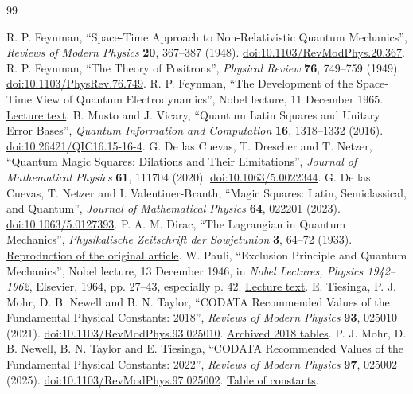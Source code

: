 \begin{thebibliography}{99}
\setlength{\itemsep}{2pt plus .5pt minus .5pt}
{}
 R. P. Feynman, ``Space-Time Approach to Non-Relativistic Quantum Mechanics'', \emph{Reviews of Modern Physics} \textbf{20}, 367--387 (1948). \href{https://doi.org/10.1103/RevModPhys.20.367}{doi:10.1103/RevModPhys.20.367}.
 R. P. Feynman, ``The Theory of Positrons'', \emph{Physical Review} \textbf{76}, 749--759 (1949). \href{https://doi.org/10.1103/PhysRev.76.749}{doi:10.1103/PhysRev.76.749}.
 R. P. Feynman, ``The Development of the Space-Time View of Quantum Electrodynamics'', Nobel lecture, 11 December 1965. \href{https://www.nobelprize.org/prizes/physics/1965/feynman/lecture/}{Lecture text}.
 B. Musto and J. Vicary, ``Quantum Latin Squares and Unitary Error Bases'', \emph{Quantum Information and Computation} \textbf{16}, 1318--1332 (2016). \href{https://doi.org/10.26421/QIC16.15-16-4}{doi:10.26421/QIC16.15-16-4}.
 G. De las Cuevas, T. Drescher and T. Netzer, ``Quantum Magic Squares: Dilations and Their Limitations'', \emph{Journal of Mathematical Physics} \textbf{61}, 111704 (2020). \href{https://doi.org/10.1063/5.0022344}{doi:10.1063/5.0022344}.
 G. De las Cuevas, T. Netzer and I. Valentiner-Branth, ``Magic Squares: Latin, Semiclassical, and Quantum'', \emph{Journal of Mathematical Physics} \textbf{64}, 022201 (2023). \href{https://doi.org/10.1063/5.0127393}{doi:10.1063/5.0127393}.
 P. A. M. Dirac, ``The Lagrangian in Quantum Mechanics'', \emph{Physikalische Zeitschrift der Sowjetunion} \textbf{3}, 64--72 (1933). \href{https://www.informationphilosopher.com/solutions/scientists/dirac/Lagrangian_1933.pdf}{Reproduction of the original article}.
 W. Pauli, ``Exclusion Principle and Quantum Mechanics'', Nobel lecture, 13 December 1946, in \emph{Nobel Lectures, Physics 1942--1962}, Elsevier, 1964, pp. 27--43, especially p. 42. \href{https://www.nobelprize.org/uploads/2018/06/pauli-lecture.pdf}{Lecture text}.
 E. Tiesinga, P. J. Mohr, D. B. Newell and B. N. Taylor, ``CODATA Recommended Values of the Fundamental Physical Constants: 2018'', \emph{Reviews of Modern Physics} \textbf{93}, 025010 (2021). \href{https://doi.org/10.1103/RevModPhys.93.025010}{doi:10.1103/RevModPhys.93.025010}. \href{https://physics.nist.gov/cuu/Constants/ArchiveASCII/allascii_2018.txt}{Archived 2018 tables}.
 P. J. Mohr, D. B. Newell, B. N. Taylor and E. Tiesinga, ``CODATA Recommended Values of the Fundamental Physical Constants: 2022'', \emph{Reviews of Modern Physics} \textbf{97}, 025002 (2025). \href{https://doi.org/10.1103/RevModPhys.97.025002}{doi:10.1103/RevModPhys.97.025002}. \href{https://physics.nist.gov/cuu/Constants/Table/allascii.txt}{Table of constants}.

\end{thebibliography}
